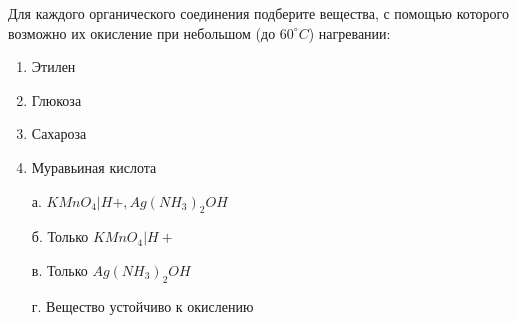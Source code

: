 
Для каждого органического соединения подберите вещества, с помощью которого
возможно их окисление при небольшом (до $60^{\circ}C$) нагревании:

\begin{multicols}{2}
\begin{enumerate}
    \item Этилен 
    \item Глюкоза 
    \item Сахароза 
    \item Муравьиная кислота
\end{enumerate}

\begin{enumerate}
    \item[а.] $KMnO_4|H+, Ag(NH_3)_2OH$
    \item[б.] Только $KMnO_4|H+$
    \item[в.] Только $Ag(NH_3)_2OH$
    \item[г.] Вещество устойчиво к окислению    
\end{enumerate}
\end{multicols}



